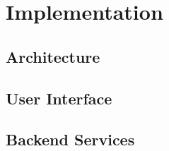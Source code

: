 \chapter{Implementation}
\label{sec:implementation}

\section{Architecture}
\label{sec:architecture}

\section{User Interface}
\label{sec:user-interface}

\section{Backend Services}
\label{sec:backend}







